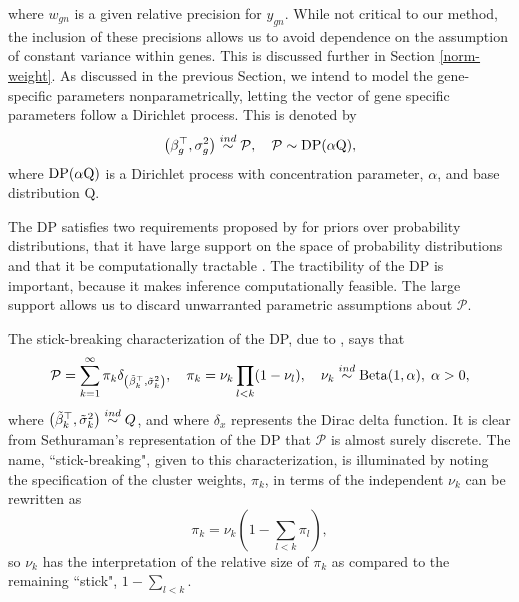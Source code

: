where $w_{gn}$ is a given relative precision for $y_{gn}$. While not critical to our method, the inclusion of these precisions allows us to avoid dependence on the assumption of constant variance within genes. This is discussed further in Section \ref{norm-weight}. As discussed in the previous Section, we intend to model the gene-specific parameters nonparametrically, letting the vector of gene specific parameters follow a Dirichlet process. This is denoted by
\begin{equation}
\left(\beta_g^\top,\sigma^2_g\right) \stackrel{ind}{\sim} \mathcal{P},\quad \mathcal{P} \sim \operatorname{DP}(\alpha \mbox{Q}),
\end{equation}
where $\operatorname{DP}(\alpha \mbox{Q})$ is a Dirichlet process with concentration parameter, $\alpha$, and base distribution $\mbox{Q}$.

The DP satisfies two requirements proposed by \citet{ferguson} for priors over probability distributions, that it have large support on the space of probability distributions and that it be computationally tractable \citep{ferguson}. The tractibility of the DP is important, because it makes inference computationally feasible. The large support allows us to discard unwarranted parametric assumptions about $\mathcal{P}$.

The stick-breaking characterization of the DP, due to \citet{sethuraman}, says that 
\begin{equation}
\label{dp-def}
\mathcal{P} =\sum_{k=1}^\infty \pi_k \delta_{\left(\tilde{\beta}_k^\top ,\tilde{\sigma}^2_k\right)},\quad \pi_k = \nu_k \prod_{l<k}(1-\nu_l), \quad 
\nu_k \stackrel{ind}{\sim} \operatorname{Beta}(1, \alpha),\; \alpha>0,
\end{equation}
where $\left(\tilde{\beta}_k^\top ,\tilde{\sigma}^2_k\right) \stackrel{ind}{\sim} Q$, and where $\delta_{x}$ represents the Dirac delta function. It is clear from Sethuraman's representation of the DP that $\mathcal{P}$ is almost surely discrete. The name, ``stick-breaking", given to this characterization, is illuminated by noting the specification of the cluster weights, $\pi_k$, in terms of the independent $\nu_k$ can be rewritten as
\begin{equation}
\label{eq:pi}
\pi_k = \nu_k\left(1-\sum_{l<k}\pi_l\right),
\end{equation} so $\nu_k$ has the interpretation of the relative size of $\pi_k$ as compared to the remaining ``stick", $1-\sum_{l<k}$.

